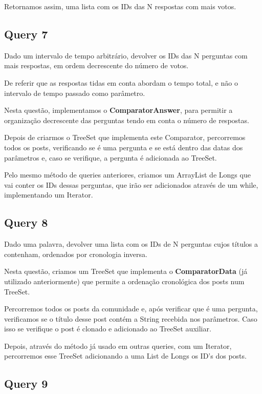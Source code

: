 \documentclass[a4paper]{article}
\begin{document}
Retornamos assim, uma lista com os IDs das N respostas com mais votos.

\subsection{Query 7}

Dado um intervalo de tempo arbitrário, devolver os IDs das N perguntas 
com mais respostas, em ordem decrescente do número de votos.

De referir que as respostas tidas em conta abordam o tempo total, e
não o intervalo de tempo passado como parâmetro.

Nesta questão, implementamos o \textbf{ComparatorAnswer}, para permitir a 
organização decrescente das perguntas tendo em conta o número de respostas.

Depois de criarmos o TreeSet que implementa este Comparator, percorremos todos os
posts, verificando se é uma pergunta e se está dentro das datas dos parâmetros e,
caso se verifique, a pergunta é adicionada ao TreeSet.

Pelo mesmo método de queries anteriores, criamos um  ArrayList de Longs que vai
conter os IDs dessas perguntas, que irão ser adicionados através de um while,
implementando um Iterator.

\subsection{Query 8}

Dado uma palavra, devolver uma lista com os IDs de N perguntas
cujos títulos a contenham, ordenados por cronologia inversa.

Nesta questão, criamos um TreeSet que implementa o \textbf{ComparatorData} (já
utilizado anteriormente) que permite a ordenação cronológica dos posts num TreeSet.

Percorremos todos os posts da comunidade e, após verificar que é uma pergunta,
verificamos se o título desse post contém a String recebida nos parâmetros. Caso 
isso se verifique o post é clonado e adicionado ao TreeSet auxiliar.

Depois, através do método já usado em outras queries, com um Iterator, percorremos
esse TreeSet adicionando a uma List de Longs os ID's dos posts.

\subsection{Query 9}
\end{document}
